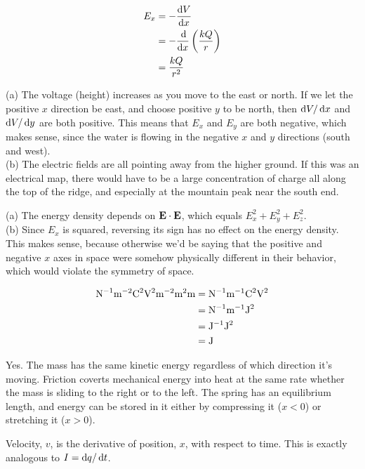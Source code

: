  \\
\begin{align*}
	E_x	&= -\frac{\operatorname{d\!} V}{\operatorname{d\!} x} \\
		&= -\frac{\operatorname{d\!}}{\operatorname{d\!} x}\left(\frac{kQ}{r}\right) \\
		&= \frac{kQ}{r^2}
\end{align*}

(a) The voltage (height) increases as you move to the east or north.
If we let the positive $x$ direction be east, and choose positive $y$ to
be north, then $\operatorname{d\!} V/\operatorname{d\!} x$ and $\operatorname{d\!} V/\operatorname{d\!} y$ are both positive. This means that $E_x$
and $E_y$ are both negative, which makes sense, since the water is
flowing in the negative $x$ and $y$ directions (south and west).\\
(b) The
electric fields are all pointing away from the higher ground. If this
was an electrical map, there would have to be a large concentration of
charge all along the top of the ridge, and especially at the mountain
peak near the south end.

(a) The energy density depends on $\textbf{E}\cdot\textbf{E}$, which equals
$E_x^2+E_y^2+E_z^2$.\\
(b) Since $E_x$ is squared, reversing its sign has no effect on the
energy density. This makes sense, because otherwise we'd be saying that
the positive and negative $x$ axes in space were somehow physically different
in their behavior, which would violate the symmetry of space.

\begin{align*}
	\textup{N}^{-1}\textup{m}^{-2}\textup{C}^2\textup{V}^2\textup{m}^{-2}\textup{m}^{2}\textup{m}
			&= \textup{N}^{-1}\textup{m}^{-1}\textup{C}^2\textup{V}^2\\
			&= \textup{N}^{-1}\textup{m}^{-1}\textup{J}^2\\
			&= \textup{J}^{-1}\textup{J}^2\\
			&= \textup{J}\\
\end{align*}

Yes. The mass has the same kinetic energy regardless of which
direction it's moving. Friction coverts mechanical energy into heat
at the same rate whether the mass is sliding to the right or to the
left. The spring has an equilibrium length, and energy can be stored
in it either by compressing it ($x<0$) or stretching it ($x>0$).

Velocity, $v$, is the derivative of position, $x$, with respect to time.
This is exactly analogous to $I=\operatorname{d\!} q/\operatorname{d\!} t$.

